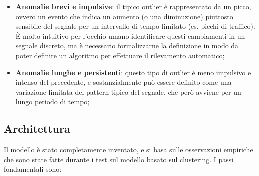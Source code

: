 \documentclass[12pt,a4paper,cucitura]{toptesi}
\begin{document}
\begin{itemize}
\item \textbf{Anomalie brevi e impulsive}: il tipico outlier è rappresentato da un picco, ovvero un evento che indica un aumento (o una diminuzione) piuttosto sensibile del segnale per un intervallo di tempo limitato (es. picchi di traffico). 
\`{E} molto intuitivo per l'occhio umano identificare questi cambiamenti in un segnale discreto, ma è necessario formalizzarne la definizione in modo da poter definire un algoritmo per effettuare il rilevamento automatico;
\item \textbf{Anomalie lunghe e persistenti}: questo tipo di outlier è meno impulsivo e intenso del precedente, e sostanzialmente può essere definito come una variazione limitata del pattern tipico del segnale, che però avviene per un lungo periodo di tempo;
\end{itemize}

\subsection{Architettura}

Il modello è stato completamente inventato, e si basa sulle osservazioni empiriche che sono state fatte durante i test sul modello basato sul clustering.
I passi fondamentali sono:
\end{document}
